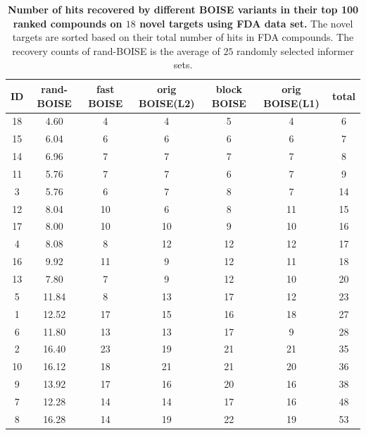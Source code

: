 \documentclass[11pt,a4paper]{article}
\theoremstyle{plain}
\begin{document}
\bigskip
\begin{table}[ht!]
\centering
\caption{\label{tab:recovery_counts}
{\bf Number of hits recovered by different BOISE variants in their top 100 ranked compounds on $18$ novel targets using FDA data set.} The novel targets are sorted based on their total number of hits in FDA compounds. The recovery counts of rand-BOISE is the average of $25$ randomly selected informer sets.}

\begin{tabular}{ ccccccc }
\multicolumn{1}{c}{ID} & \multicolumn{1}{c}{rand-BOISE} & \multicolumn{1}{c}{fast BOISE} & \multicolumn{1}{c}{orig BOISE(L2)} & \multicolumn{1}{c}{block BOISE} & 
\multicolumn{1}{c}{orig BOISE(L1)} & 
\multicolumn{1}{c}{total} \\
 \hline
 18 & 4.60 & 4 & 4 & 5 & 4 & 6 \\
 15 & 6.04 & 6 & 6 & 6 & 6 & 7 \\
 14 & 6.96 & 7 & 7 & 7 & 7 & 8 \\
 11 & 5.76 & 7 & 7 & 6 & 7 & 9 \\
 3 & 5.76 & 6 & 7 & 8 & 7 & 14 \\
 12 & 8.04 & 10 & 6 & 8 & 11 & 15 \\
 17 & 8.00 & 10 & 10 & 9 & 10 & 16 \\
 4 & 8.08 & 8 & 12 & 12 & 12 & 17 \\
 16 & 9.92 & 11 & 9 & 12 & 11 & 18 \\
 13 & 7.80 & 7 & 9 & 12 & 10 & 20 \\
 5 & 11.84 & 8 & 13 & 17 & 12 & 23 \\
 1 & 12.52 & 17 & 15 & 16 & 18 & 27 \\
 6 & 11.80 & 13 & 13 & 17 & 9 & 28 \\
 2 & 16.40 & 23 & 19 & 21 & 21 & 35 \\
 10 & 16.12 & 18 & 21 & 21 & 20 & 36 \\
 9 & 13.92 & 17 & 16 & 20 & 16 & 38 \\
 7 & 12.28 & 14 & 14 & 17 & 16 & 48 \\
 8 & 16.28 & 14 & 19 & 22 & 19 & 53 \\
\end{tabular}\\
\end{table}
\bigskip
\end{document}
